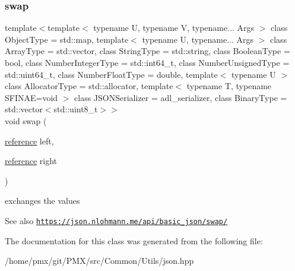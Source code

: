 \subsubsection{\texorpdfstring{swap}{swap}}
{\footnotesize\ttfamily template$<$template$<$ typename U, typename V, typename... Args $>$ class Object\+Type = std\+::map, template$<$ typename U, typename... Args $>$ class Array\+Type = std\+::vector, class String\+Type  = std\+::string, class Boolean\+Type  = bool, class Number\+Integer\+Type  = std\+::int64\+\_\+t, class Number\+Unsigned\+Type  = std\+::uint64\+\_\+t, class Number\+Float\+Type  = double, template$<$ typename U $>$ class Allocator\+Type = std\+::allocator, template$<$ typename T, typename S\+F\+I\+N\+A\+E=void $>$ class J\+S\+O\+N\+Serializer = adl\+\_\+serializer, class Binary\+Type  = std\+::vector$<$std\+::uint8\+\_\+t$>$$>$ \\
void swap (\begin{DoxyParamCaption}\item[{\hyperlink{classnlohmann_1_1basic__json_a220ae98554a76205fb7f8822d36b2d5a}{reference}}]{left,  }\item[{\hyperlink{classnlohmann_1_1basic__json_a220ae98554a76205fb7f8822d36b2d5a}{reference}}]{right }\end{DoxyParamCaption})\hspace{0.3cm}{\ttfamily [friend]}}



exchanges the values 

\begin{DoxySeeAlso}{See also}
\href{https://json.nlohmann.me/api/basic_json/swap/}{\tt https\+://json.\+nlohmann.\+me/api/basic\+\_\+json/swap/} 
\end{DoxySeeAlso}


The documentation for this class was generated from the following file\+:\begin{DoxyCompactItemize}
\item 
/home/pmx/git/\+P\+M\+X/src/\+Common/\+Utils/json.\+hpp\end{DoxyCompactItemize}
